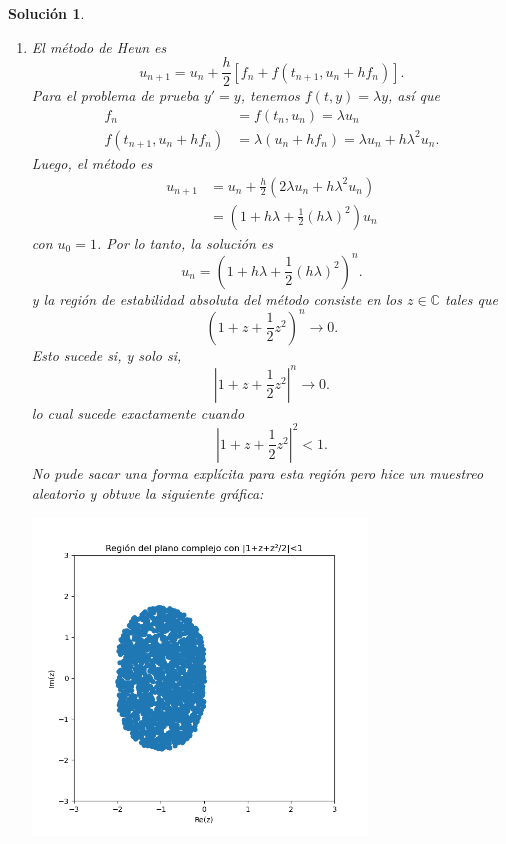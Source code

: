 \documentclass[11pt]{article}
\newtheorem*{sol}{Solución}
\newcommand\C{\mathbb C}
\begin{document}
\begin{sol}
  \begin{enumerate}
    \item
      El método de Heun es
      \begin{equation}
        u_{n+1} = u_n + \frac{h}{2}[f_n + f(t_{n+1},u_n+hf_n)]
      .\end{equation}
      Para el problema de prueba $y'=y$, tenemos $f(t,y)=\lambda y$,
      así que
      \begin{align}
        f_n
          &= f(t_n,u_n)
          = \lambda u_n \\
        f(t_{n+1},u_{n}+hf_n)
          &= \lambda(u_{n}+hf_n)
          = \lambda u_n + h\lambda^{2} u_n
      .\end{align}
      Luego, el método es
      \begin{align}
        u_{n+1}
        &= u_n + \frac{h}{2}(2\lambda u_n + h\lambda^{2} u_n) \\
        &= \left(1 + h\lambda + \frac{1}{2}(h\lambda)^{2}\right) u_n
      \end{align}
      con $u_0=1$.
      Por lo tanto, la solución es
      \begin{equation}
        u_n
        = \left(1 + h\lambda + \frac{1}{2}(h\lambda)^{2}\right)^{n}
      .\end{equation}
      y la región de estabilidad absoluta del método consiste en los
      $z\in\C$ tales que
      \begin{equation}
        \left(1 + z + \frac{1}{2}z^{2}\right)^{n} \to 0
      .\end{equation}
      Esto sucede si, y solo si, 
      \begin{equation}
        \left|1 + z + \frac{1}{2}z^{2}\right|^{n} \to 0
      .\end{equation}
      lo cual sucede exactamente cuando
      \begin{equation}
        \left|1 + z + \frac{1}{2}z^{2}\right|^{2}<1
      .\end{equation}
      No pude sacar una forma explícita para esta región pero hice un
      muestreo aleatorio y obtuve la siguiente gráfica:
      \begin{center}
        \includegraphics[width=0.7\textwidth]
        {img/jaac_tarea2_ejercicio2a.png}
      \end{center}
        

\end{enumerate}
\end{sol}
\end{document}
